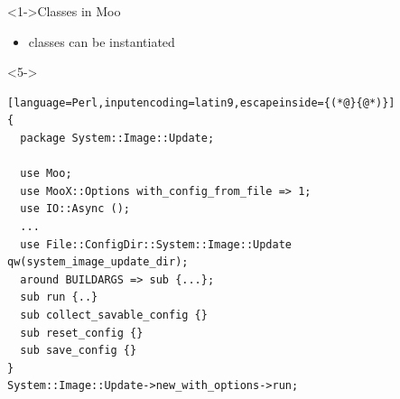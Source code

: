 \documentclass[ngerman,xcolor={table,dvipsnames},smaller,compress,hyperref={bookmarks,colorlinks},handout]{beamer}%
\begin{document}
\begin{frame}[t,fragile]

\begin{block}<1->{Classes in Moo}
\begin{itemize}
\item classes can be instantiated
\end{itemize}
\end{block}

\begin{block}<5->{}
\scriptsize
\begin{lstlisting}[language=Perl,inputencoding=latin9,escapeinside={(*@}{@*)}]
{
  package System::Image::Update;

  use Moo;
  use MooX::Options with_config_from_file => 1;
  use IO::Async ();
  ...
  use File::ConfigDir::System::Image::Update qw(system_image_update_dir);
  around BUILDARGS => sub {...};
  sub run {..}
  sub collect_savable_config {}
  sub reset_config {}
  sub save_config {}
}
System::Image::Update->new_with_options->run;
\end{lstlisting}
\end{block}

\end{frame}
\end{document}
